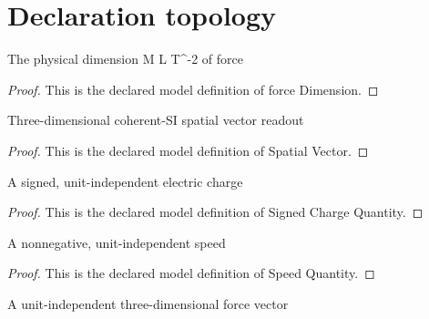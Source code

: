 \section{Declaration topology}
\begin{definition}
  \label{def:physics:phyx-mini-0963:phyxminiproblems-problemphyxmini0963-forcedimension}
  The physical dimension M L T\textasciicircum{}-2 of force
\end{definition}
\begin{proof}
  This is the declared model definition of force Dimension.
\end{proof}
\begin{definition}
  \label{def:physics:phyx-mini-0963:phyxminiproblems-problemphyxmini0963-spatialvector}
  Three-dimensional coherent-SI spatial vector readout
\end{definition}
\begin{proof}
  This is the declared model definition of Spatial Vector.
\end{proof}
\begin{definition}
  \label{def:physics:phyx-mini-0963:phyxminiproblems-problemphyxmini0963-signedchargequantity}
  A signed, unit-independent electric charge
\end{definition}
\begin{proof}
  This is the declared model definition of Signed Charge Quantity.
\end{proof}
\begin{definition}
  \label{def:physics:phyx-mini-0963:phyxminiproblems-problemphyxmini0963-speedquantity}
  A nonnegative, unit-independent speed
\end{definition}
\begin{proof}
  This is the declared model definition of Speed Quantity.
\end{proof}
\begin{definition}
  \label{def:physics:phyx-mini-0963:phyxminiproblems-problemphyxmini0963-forcevectorquantity}
  A unit-independent three-dimensional force vector
\end{definition}
